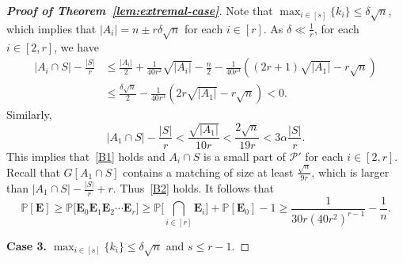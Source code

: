 \documentclass[11pt, a4paper]{article}
\theoremstyle{definition}
\newcommand{\<}{\subseteq}
\newcommand{\de}{\delta}
\begin{document}
\begin{proof}[{\bf Proof of Theorem~\ref{lem:extremal-case}}]
Note that $\max_{i\in [s]}\{k_i\}\leq \de \sqrt{n}$, {which implies that $|A_i|=n\pm r\de\sqrt{n}$ for each $i\in [r]$. As $\de\ll\frac{1}{r}$,} for each $i\in [2,r]$, we have 
\begin{align*}
|A_i\cap S|-\frac{|S|}{r}&\le\frac{|A_i|}{2}+\frac{1}{40r^2}\sqrt{|A_i|}-\frac{n}{2}-\frac{1}{40r^3}\left((2r+1)\sqrt{|A_1|}-r\sqrt{n}\right)\\
&\leq \frac{\delta\sqrt{n}}{2}-\frac{1}{40r^3}\left(2r\sqrt{|A_1|}-r\sqrt{n}\right)<0.
\end{align*}
Similarly, 
$$
|A_1\cap S|-\frac{|S|}{r}<\frac{\sqrt{|A_1|}}{10r}<\frac{2\sqrt{n}}{19r}<3\alpha \frac{|S|}{r}. 
$$
This implies that~\ref{B1} holds and $A_i\cap S$ is a small part of $\mathcal{P}'$ for each $i\in [2,r]$. 
Recall that $G[A_1\cap S]$ contains a matching of size at least $\frac{\sqrt{n}}{9r}$, 
which is larger than $|A_1\cap S|-\frac{|S|}{r}+r$. Thus~\ref{B2} holds. It follows that  $${\mathbb{P}[\mathbf{E}]\geq \mathbb{P}\big[\mathbf{E}_0\mathbf{E}_1\mathbf{E}_2\cdots\mathbf{E}_r \big]\geq \mathbb{P}\Big[{\bigcap_{i\in [r]}\mathbf{E}_i}\Big]+
\mathbb{P}[\mathbf{E}_0 ]-1\ge  \frac{1}{30r(40r^2)^{r-1}}-\frac{1}{n}.}$$

\medskip
{\bf Case 3.} $\max_{i\in [s]}\{k_i\}\leq \de\sqrt{n}$ and $s\leq r-1$.
\medskip


\end{proof}
\end{document}
